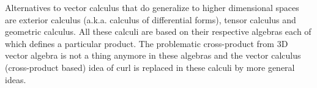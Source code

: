 \medskip
Alternatives to vector calculus that do generalize to higher dimensional spaces are exterior calculus (a.k.a. calculus of differential forms), tensor calculus and geometric calculus. All these calculi are based on their respective algebras each of which defines a particular product. The problematic cross-product from 3D vector algebra is not a thing anymore in these algebras and the vector calculus (cross-product based) idea of curl is replaced in these calculi by more general ideas.



\begin{comment}




\end{comment} 